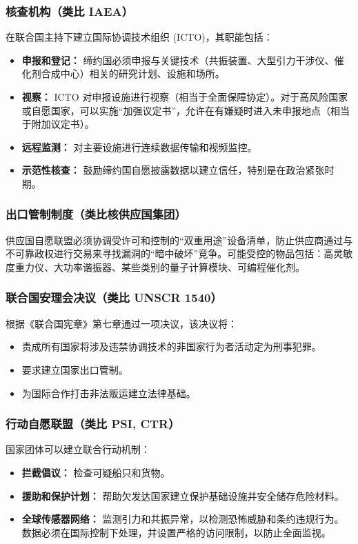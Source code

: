 \documentclass[12pt,a4paper]{article}
\theoremstyle{remark}
\begin{document}
	\subsubsection{核查机构（类比 IAEA）}
	
	在联合国主持下建立国际协调技术组织 (ICTO)，其职能包括：
	\begin{itemize}
		\item \textbf{申报和登记：} 缔约国必须申报与关键技术（共振装置、大型引力干涉仪、催化剂合成中心）相关的研究计划、设施和场所。
		\item \textbf{视察：} ICTO 对申报设施进行视察（相当于全面保障协定）。对于高风险国家或自愿国家，可以实施“加强议定书”，允许在有嫌疑时进入未申报地点（相当于附加议定书）。
		\item \textbf{远程监测：} 对主要设施进行连续数据传输和视频监控。
		\item \textbf{示范性核查：} 鼓励缔约国自愿披露数据以建立信任，特别是在政治紧张时期。
	\end{itemize}
	
	\subsubsection{出口管制制度（类比核供应国集团）}
	
	供应国自愿联盟必须协调受许可和控制的“双重用途”设备清单，防止供应商通过与不可靠政权进行交易来寻找漏洞的“暗中破坏”竞争。可能受控的物品包括：高灵敏度重力仪、大功率谐振器、某些类别的量子计算模块、可编程催化剂。
	
	\subsubsection{联合国安理会决议（类比 UNSCR 1540）}
	
	根据《联合国宪章》第七章通过一项决议，该决议将：
	\begin{itemize}
		\item 责成所有国家将涉及违禁协调技术的非国家行为者活动定为刑事犯罪。
		\item 要求建立国家出口管制。
		\item 为国际合作打击非法贩运建立法律基础。
	\end{itemize}
	
	\subsubsection{行动自愿联盟（类比 PSI, CTR）}
	
	国家团体可以建立联合行动机制：
	\begin{itemize}
		\item \textbf{拦截倡议：} 检查可疑船只和货物。
		\item \textbf{援助和保护计划：} 帮助欠发达国家建立保护基础设施并安全储存危险材料。
		\item \textbf{全球传感器网络：} 监测引力和共振异常，以检测恐怖威胁和条约违规行为。数据必须在国际控制下处理，并设置严格的访问限制，以防止全面监视。
	\end{itemize}
	
\end{document}
